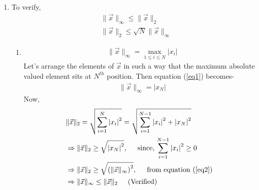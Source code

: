 \documentclass[11pt]{article} %
\begin{document}
\begin{enumerate}
\item
To verify,
\begin{equation*}
\begin{split}
&\|\Vec x\|_{\infty} \leq \|\Vec x\|_{2} \\
&\|\Vec x\|_2 \leq \sqrt{N}\|\Vec x\|_{\infty} 
\end{split}
\end{equation*}
\begin{enumerate}[\textbf{(\alph*)}]
\renewcommand{\labelenumi}{\bfseries\theenumi.}
\item 
\begin{equation}
\begin{split}
&\|\Vec x\|_{\infty} = \max\limits_{1\leq i \leq N}{\vert x_i\vert}
\end{split}
\label{eq1}
\end{equation}
Let's arrange the elements of $\Vec x$ in such a way that the maximum absolute valued element sits at $N^{th}$ position. Then equation (\ref{eq1}) becomes-
\begin{equation}
\begin{split}
&\|\Vec x\|_{\infty} = \vert x_N\vert
\end{split}
\label{eq2}
\end{equation}
Now,
\begin{equation*}
\begin{split}
&\|\Vec x\|_2 = \sqrt{\sum\limits_{i=1}^N{\vert x_i\vert}^2} = \sqrt{\sum\limits_{i=1}^{N-1}{\vert x_i\vert}^2+{\vert x_N\vert}^2}  \\
&\Rightarrow \|\Vec x\|_2 \geq \sqrt{{\vert x_N\vert}^2}, \hspace{0.5cm} \text{since, $\sum\limits_{i=1}^{N-1}{\vert x_i\vert}^2 \geq 0$}\\
&\Rightarrow \|\Vec x\|_2 \geq \sqrt{{(\|\Vec x\|_{\infty})}^2}, \hspace{0.5cm} \text{from equation (\ref{eq2})}\\
&\Rightarrow \|\Vec x\|_{\infty} \leq \|\Vec x\|_2 \hspace{0.5cm} \text{(Verified)}
\end{split}
\end{equation*}


\end{enumerate}
\end{enumerate}
\end{document}
